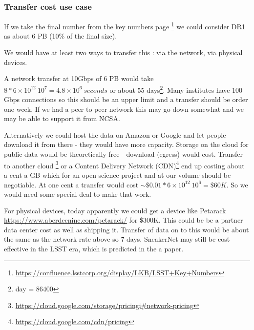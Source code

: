 \subsubsection{Transfer cost use case}
If we take the final number from the key numbers page \footnote{\url{https://confluence.lsstcorp.org/display/LKB/LSST+Key+Numbers}} we could consider DR1 as about 6 PB (10\% of the final size).

We would have at least  two ways to transfer this : via the network, via physical devices.

A network transfer at 10Gbps of 6 PB would take $8 * 6 \times 10^{12} \ 10^7 = 4.8 \times 10^{6}~seconds $ or about 55 days\footnote{ day = 86400}.
Many institutes have 100 Gbps connections so this should be an upper limit and a transfer should be order one week. If we had a peer to peer network this may go down somewhat and we may be able to support it from NCSA.

Alternatively we could host the data on Amazon or Google and let people download it from there - they would have more capacity.
Storage on the cloud  for public data would be theoretically free - download (egress)  would  cost.
Transfer to another cloud \footnote{\url{https://cloud.google.com/storage/pricingi\#network-pricing}}  or
 a Content Delivery Network (CDN)\footnote{\url{https://cloud.google.com/cdn/pricing}}
 end up costing  about a cent a GB which for an open science project and at our volume  should  be negotiable.  At one cent a transfer would cost
  $\sim \$0.01 * 6 \times 10^{12} \ 10^6 = \$60K$.
So we would need some special deal to make that work.

For physical devices, today apparently we could get a device like Petarack \url{https://www.aberdeeninc.com/petarack/} for \$300K.
This could be be a partner data center cost as well as shipping it. Transfer of data on to this would be about the same as the network rate above so 7 days. SneakerNet \cite{2002cs........8011G} may still be  cost effective in the LSST era, which is predicted in the a paper.


